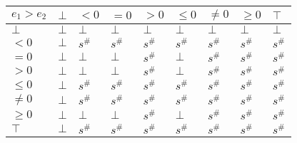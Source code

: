 \documentclass{article}
\begin{document}
                \begin{table}
                    \begin{tabular}{|l|l|l|l|l|l|l|l|l|}
                    \hline
                    $e_1 > e_2$ & $\bot$ & $<0$   & $=0$   & $>0$   & $\le 0$ & $\ne 0$ & $\ge 0$ & $\top$ \\ \hline
                    $\bot$      & $\bot$ & $\bot$ & $\bot$ & $\bot$ & $\bot$  & $\bot$  & $\bot$  & $\bot$ \\ \hline
                    $<0$        & $\bot$ & $s^\#$ & $s^\#$ & $s^\#$ & $s^\#$  & $s^\#$  & $s^\#$  & $s^\#$ \\ \hline
                    $=0$        & $\bot$ & $\bot$ & $\bot$ & $s^\#$ & $\bot$  & $s^\#$  & $s^\#$  & $s^\#$ \\ \hline
                    $>0$        & $\bot$ & $\bot$ & $\bot$ & $s^\#$ & $\bot$  & $s^\#$  & $s^\#$  & $s^\#$ \\ \hline
                    $\le 0$     & $\bot$ & $s^\#$ & $s^\#$ & $s^\#$ & $s^\#$  & $s^\#$  & $s^\#$  & $s^\#$ \\ \hline
                    $\ne 0$     & $\bot$ & $s^\#$ & $s^\#$ & $s^\#$ & $s^\#$  & $s^\#$  & $s^\#$  & $s^\#$ \\ \hline
                    $\ge 0$     & $\bot$ & $\bot$ & $\bot$ & $s^\#$ & $\bot$  & $s^\#$  & $s^\#$  & $s^\#$ \\ \hline
                    $\top$      & $\bot$ & $s^\#$ & $s^\#$ & $s^\#$ & $s^\#$  & $s^\#$  & $s^\#$  & $s^\#$ \\ \hline
                    \end{tabular}
                    \end{table}
\end{document}
